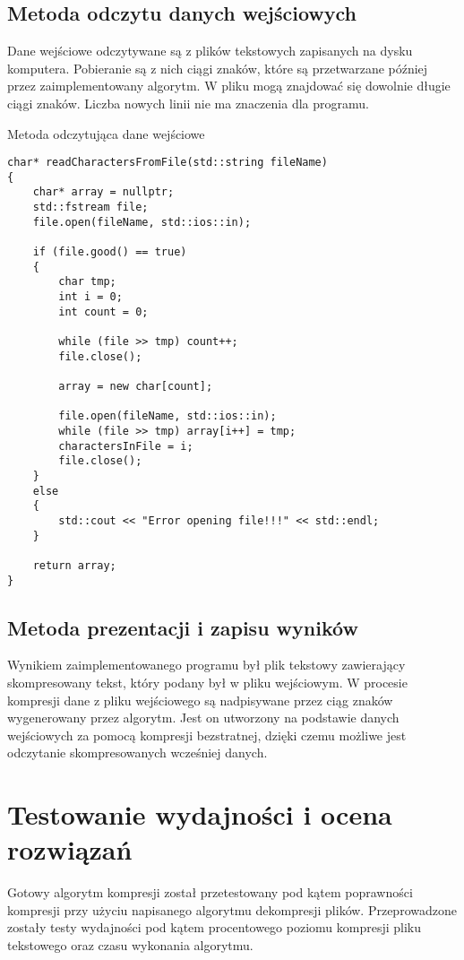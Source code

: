 \documentclass[12pt,a4paper,titlepage]{article}
\begin{document}
\newpage
\subsection{Metoda odczytu danych wejściowych}
Dane wejściowe odczytywane są z plików tekstowych zapisanych na dysku komputera. Pobieranie są z nich ciągi znaków, które są przetwarzane później przez zaimplementowany algorytm. W pliku mogą znajdować się dowolnie długie ciągi znaków. Liczba nowych linii nie ma znaczenia dla programu.

\begin{listing}[H]
\caption{Metoda odczytująca dane wejściowe}
\begin{verbatim}
char* readCharactersFromFile(std::string fileName)
{
    char* array = nullptr;
    std::fstream file;
    file.open(fileName, std::ios::in);

    if (file.good() == true)
    {
        char tmp;
        int i = 0;
        int count = 0;

        while (file >> tmp) count++;
        file.close();

        array = new char[count];

        file.open(fileName, std::ios::in);
        while (file >> tmp) array[i++] = tmp;
        charactersInFile = i;
        file.close();
    }
    else
    {
        std::cout << "Error opening file!!!" << std::endl;
    }

    return array;
}
\end{verbatim}
\end{listing}

\subsection{Metoda prezentacji i zapisu wyników}
Wynikiem zaimplementowanego programu był plik tekstowy zawierający skompresowany tekst, który podany był w pliku wejściowym. W procesie kompresji dane z pliku wejściowego są nadpisywane przez ciąg znaków wygenerowany przez algorytm. Jest on utworzony na podstawie danych wejściowych za pomocą kompresji bezstratnej, dzięki czemu możliwe jest odczytanie skompresowanych wcześniej danych.

\newpage
\section{Testowanie wydajności i ocena rozwiązań}
Gotowy algorytm kompresji został przetestowany pod kątem poprawności kompresji przy użyciu napisanego algorytmu dekompresji plików. Przeprowadzone zostały testy wydajności pod kątem procentowego poziomu kompresji pliku tekstowego oraz czasu wykonania algorytmu.\newline
\end{document}
